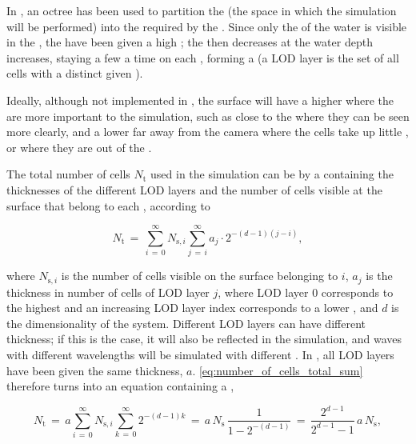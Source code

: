 In \thisprojectwork, an octree has been used to partition the  (the space in which the simulation will be performed) into the \cells required by the \FVM. Since only the \surface of the water is visible in the \simulation, the  have been given a high \LOD; the \LOD then decreases at the water depth increases, staying a few  a time on each \LOD, forming a  (a LOD layer is the set of all cells with a distinct given \LOD).

Ideally, although not implemented in \thisprojectwork, the surface will have a higher \LOD where the  are more important to the simulation, such as close to the \camera where they can be seen more clearly, and a lower \LOD far away from the camera where the cells take up little , or where they are out of the \FOV.

The total number of cells $N_{\text{t}}$ used in the simulation can be \approximated by a  containing the thicknesses of the different LOD layers and the number of cells visible at the surface that belong to each \LOD, according to

\begin{equation} \label{eq:number_of_cells_total_sum}
N_{\text{t}} \,=\, \sum_{i\,=\,0}^\infty N_{\text{s},i}\sum_{j\,=\,i}^\infty a_j\cdot 2^{-(d-1)(j-i)},
\end{equation}

where $N_{\text{s},i}$ is the number of cells visible on the surface belonging to  $i$, $a_j$ is the thickness in number of cells of LOD layer $j$, where LOD layer $0$ corresponds to the highest \LOD and an increasing LOD layer index corresponds to a lower \LOD, and $d$ is the dimensionality of the system. Different LOD layers can have different thickness; if this is the case, it will also be reflected in the simulation, and waves with different wavelengths will be simulated with different \accuracy. In \thisprojectwork, all LOD layers have been given the same thickness, $a$. \eqref{eq:number_of_cells_total_sum} therefore turns into an equation containing a ,

\begin{equation} \label{eq:number_of_cells_total}
N_{\text{t}} \,=\, a\sum_{i\,=\,0}^\infty N_{\text{s},i}\sum_{k\,=\,0}^\infty 2^{-(d-1)k} \,=\, a\,N_{\text{s}}\,\frac{1}{1-2^{-(d-1)}} \,=\, \frac{2^{d-1}}{2^{d-1}-1}\,a\,N_{\text{s}},
\end{equation}

